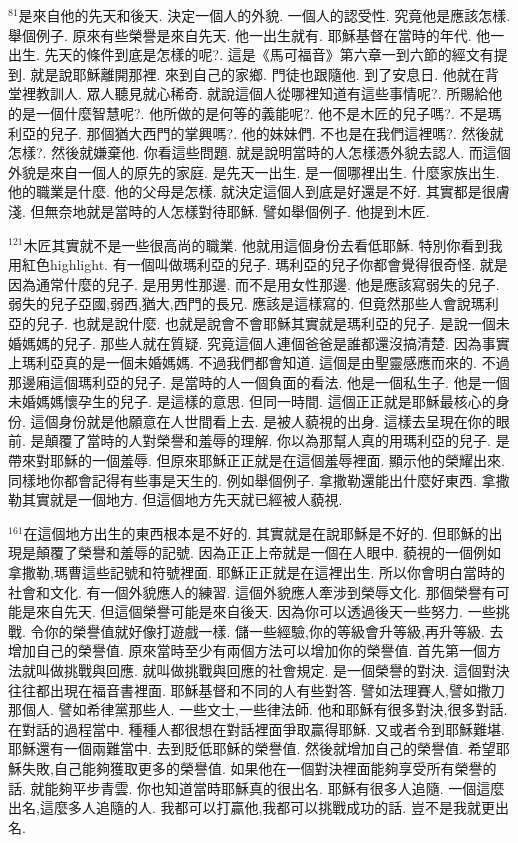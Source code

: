 \documentclass{book}
\begin{document}
$^{81}$是來自他的先天和後天.
決定一個人的外貌.
一個人的認受性.
究竟他是應該怎樣.
舉個例子.
原來有些榮譽是來自先天.
他一出生就有.
耶穌基督在當時的年代.
他一出生.
先天的條件到底是怎樣的呢?.
這是《馬可福音》第六章一到六節的經文有提到.
就是說耶穌離開那裡.
來到自己的家鄉.
門徒也跟隨他.
到了安息日.
他就在背堂裡教訓人.
眾人聽見就心稀奇.
就說這個人從哪裡知道有這些事情呢?.
所賜給他的是一個什麼智慧呢?.
他所做的是何等的義能呢?.
他不是木匠的兒子嗎?.
不是瑪利亞的兒子.
那個猶大西門的掌興嗎?.
他的妹妹們.
不也是在我們這裡嗎?.
然後就怎樣?.
然後就嫌棄他.
你看這些問題.
就是說明當時的人怎樣憑外貌去認人.
而這個外貌是來自一個人的原先的家庭.
是先天一出生.
是一個哪裡出生.
什麼家族出生.
他的職業是什麼.
他的父母是怎樣.
就決定這個人到底是好還是不好.
其實都是很膚淺.
但無奈地就是當時的人怎樣對待耶穌.
譬如舉個例子.
他提到木匠.

$^{121}$木匠其實就不是一些很高尚的職業.
他就用這個身份去看低耶穌.
特別你看到我用紅色highlight.
有一個叫做瑪利亞的兒子.
瑪利亞的兒子你都會覺得很奇怪.
就是因為通常什麼的兒子.
是用男性那邊.
而不是用女性那邊.
他是應該寫弱失的兒子.
弱失的兒子亞國,弱西,猶大,西門的長兄.
應該是這樣寫的.
但竟然那些人會說瑪利亞的兒子.
也就是說什麼.
也就是說會不會耶穌其實就是瑪利亞的兒子.
是說一個未婚媽媽的兒子.
那些人就在質疑.
究竟這個人連個爸爸是誰都還沒搞清楚.
因為事實上瑪利亞真的是一個未婚媽媽.
不過我們都會知道.
這個是由聖靈感應而來的.
不過那邊廂這個瑪利亞的兒子.
是當時的人一個負面的看法.
他是一個私生子.
他是一個未婚媽媽懷孕生的兒子.
是這樣的意思.
但同一時間.
這個正正就是耶穌最核心的身份.
這個身份就是他願意在人世間看上去.
是被人藐視的出身.
這樣去呈現在你的眼前.
是顛覆了當時的人對榮譽和羞辱的理解.
你以為那幫人真的用瑪利亞的兒子.
是帶來對耶穌的一個羞辱.
但原來耶穌正正就是在這個羞辱裡面.
顯示他的榮耀出來.
同樣地你都會記得有些事是天生的.
例如舉個例子.
拿撒勒還能出什麼好東西.
拿撒勒其實就是一個地方.
但這個地方先天就已經被人藐視.

$^{161}$在這個地方出生的東西根本是不好的.
其實就是在說耶穌是不好的.
但耶穌的出現是顛覆了榮譽和羞辱的記號.
因為正正上帝就是一個在人眼中.
藐視的一個例如拿撒勒,瑪曹這些記號和符號裡面.
耶穌正正就是在這裡出生.
所以你會明白當時的社會和文化.
有一個外貌應人的練習.
這個外貌應人牽涉到榮辱文化.
那個榮譽有可能是來自先天.
但這個榮譽可能是來自後天.
因為你可以透過後天一些努力.
一些挑戰.
令你的榮譽值就好像打遊戲一樣.
儲一些經驗,你的等級會升等級,再升等級.
去增加自己的榮譽值.
原來當時至少有兩個方法可以增加你的榮譽值.
首先第一個方法就叫做挑戰與回應.
就叫做挑戰與回應的社會規定.
是一個榮譽的對決.
這個對決往往都出現在福音書裡面.
耶穌基督和不同的人有些對答.
譬如法理賽人,譬如撒刀那個人.
譬如希律黨那些人.
一些文士,一些律法師.
他和耶穌有很多對決,很多對話.
在對話的過程當中.
種種人都很想在對話裡面爭取贏得耶穌.
又或者令到耶穌難堪.
耶穌還有一個兩難當中.
去到貶低耶穌的榮譽值.
然後就增加自己的榮譽值.
希望耶穌失敗,自己能夠獲取更多的榮譽值.
如果他在一個對決裡面能夠享受所有榮譽的話.
就能夠平步青雲.
你也知道當時耶穌真的很出名.
耶穌有很多人追隨.
一個這麼出名,這麼多人追隨的人.
我都可以打贏他,我都可以挑戰成功的話.
豈不是我就更出名.
\end{document}
